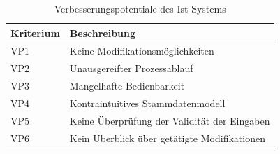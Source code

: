 \begin{table}[H]
	\centering
	\begin{tabularx}{\textwidth}{l X} 
		\toprule
		\textbf{Kriterium}  &   
		\textbf{Beschreibung}  \\ 
		\midrule
		VP1 &   
		Keine Modifikationsmöglichkeiten  \\  \cmidrule(r){1-1} \cmidrule(r){2-2}
		VP2 &   
		Unausgereifter Prozessablauf \\ \cmidrule(r){1-1} \cmidrule(r){2-2}
		VP3 &   
		Mangelhafte Bedienbarkeit  \\ \cmidrule(r){1-1} \cmidrule(r){2-2}
		VP4 &   
		Kontraintuitives Stammdatenmodell  \\ \cmidrule(r){1-1} \cmidrule(r){2-2}
		VP5 &   
		Keine Überprüfung der Validität der Eingaben  \\ \cmidrule(r){1-1} \cmidrule(r){2-2}
		VP6 &   
		Kein Überblick über getätigte Modifikationen  \\
	    \bottomrule
	\end{tabularx}
	\caption{\label{tab:potentiale}Verbesserungspotentiale des Ist-Systems}
\end{table}
